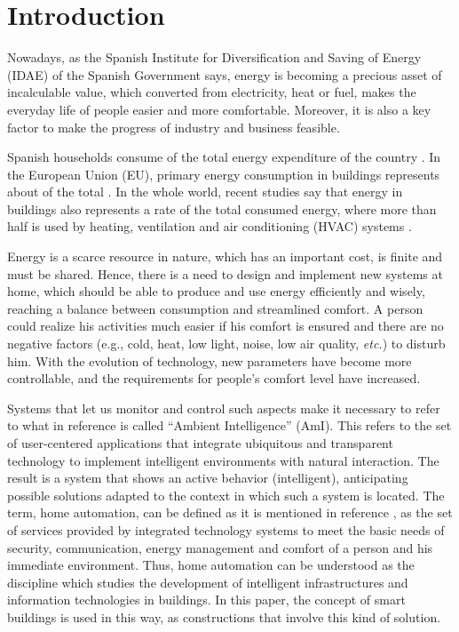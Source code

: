 \documentclass[energies,article,accept,moreauthors,pdftex,12pt,a4paper]{mdpi}
\begin{document}
\section{Introduction}


\label{sec:introduction}
Nowadays, as the Spanish Institute for Diversification and Saving of Energy
(IDAE) \cite{IDAE} of the Spanish Government says, energy is becoming a precious
asset of incalculable value, which converted from electricity, heat or fuel,
makes the everyday life of people easier and more comfortable. Moreover, it
is also a key factor to make the progress of industry and
business feasible.

Spanish households consume  of the total energy expenditure
of the country \cite{IDAE}. In the European Union (EU), primary energy consumption
in buildings represents about  of the total \cite{Ferreira}. In the whole
world, recent studies say that energy in buildings also represents a  rate
of the total consumed energy, where more than half is used by heating, ventilation and air conditioning (HVAC) systems \cite{Alvarez}.

Energy is a scarce resource in nature, which has an important cost, is
finite and must be shared. \linebreak Hence, there is a need to design and implement new
systems at home, which should be able to produce and use energy efficiently and
wisely, reaching a balance between consumption and streamlined comfort. A person
could realize his activities much easier if his comfort is ensured and there are
no negative factors (e.g., cold, heat, low light, noise, low air quality, {\it etc.})
to disturb him. With the evolution of technology, new parameters have become more
controllable, and the requirements for people's comfort level \linebreak have increased.

Systems that let us monitor and control such aspects make it necessary to refer
to what in reference \cite{Arroyo} is called ``Ambient Intelligence'' (AmI). This refers
to the set of user-centered applications that integrate ubiquitous and
transparent technology to implement intelligent environments with natural
interaction. The result is a system that shows an active behavior (intelligent),
anticipating possible solutions adapted to the context in which such a system is
located. The term, home automation, can be defined as it is mentioned
in reference \cite{Sierra}, as the set of services provided by integrated technology
systems to meet the basic needs of security, communication, energy management
and comfort of a person and his immediate environment. Thus, home automation can
be understood as the discipline which studies the development of intelligent
infrastructures and information technologies in buildings. In this paper, the concept of smart
 buildings is used in this way, as constructions that involve this kind
of solution.
\end{document}
